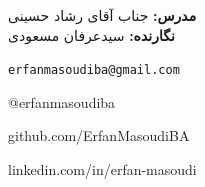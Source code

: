 \documentclass[12pt, a4paper]{article}
\begin{document}
\begin{titlepage}
\begin{center}
    \vspace{1.5cm}
    \begin{minipage}{0.6\textwidth}
        \centering
        \large
        \faUser\ \textbf{مدرس:} جناب آقای رشاد حسینی \\[0.4cm]
        \faUserGraduate\ \textbf{نگارنده:} سیدعرفان مسعودی
    \end{minipage}
\end{center}

\vfill

\begin{tcolorbox}[
    enhanced,
    colback=lightbg,
    colframe=rulegray,
    arc=3mm,
    boxrule=0.5pt,
    left=10pt, right=10pt, top=12pt, bottom=12pt
]
    \centering
    \small
    \begin{minipage}{0.46\textwidth}
        \centering \faEnvelope\ \texttt{erfanmasoudiba@gmail.com}
    \end{minipage}%
    \begin{minipage}{0.46\textwidth}
        \centering \faTelegram\ @erfanmasoudiba
    \end{minipage}

    \vspace{0.35cm}

    \begin{minipage}{0.46\textwidth}
        \centering \faGithub\ github.com/ErfanMasoudiBA
    \end{minipage}%
    \begin{minipage}{0.46\textwidth}
        \centering \faLinkedin\ linkedin.com/in/erfan-masoudi
    \end{minipage}
\end{tcolorbox}

\vspace{0.8cm}

\end{titlepage}
\restoregeometry

\newpage
\tableofcontents
\newpage

\setcounter{page}{1}

 
\clearpage
 
\clearpage
\end{document}
